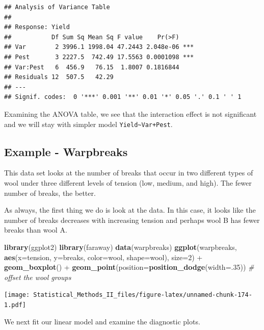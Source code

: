 \documentclass[]{book}
\newenvironment{Shaded}{\begin{snugshade}}{\end{snugshade}}
\newcommand{\KeywordTok}[1]{\textcolor[rgb]{0.13,0.29,0.53}{\textbf{{#1}}}}
\newcommand{\DataTypeTok}[1]{\textcolor[rgb]{0.13,0.29,0.53}{{#1}}}
\newcommand{\DecValTok}[1]{\textcolor[rgb]{0.00,0.00,0.81}{{#1}}}
\newcommand{\StringTok}[1]{\textcolor[rgb]{0.31,0.60,0.02}{{#1}}}
\newcommand{\CommentTok}[1]{\textcolor[rgb]{0.56,0.35,0.01}{\textit{{#1}}}}
\newcommand{\NormalTok}[1]{{#1}}
\theoremstyle{definition}
\theoremstyle{definition}
\theoremstyle{remark}
\begin{document}
\begin{verbatim}
## Analysis of Variance Table
## 
## Response: Yield
##           Df Sum Sq Mean Sq F value    Pr(>F)    
## Var        2 3996.1 1998.04 47.2443 2.048e-06 ***
## Pest       3 2227.5  742.49 17.5563 0.0001098 ***
## Var:Pest   6  456.9   76.15  1.8007 0.1816844    
## Residuals 12  507.5   42.29                      
## ---
## Signif. codes:  0 '***' 0.001 '**' 0.01 '*' 0.05 '.' 0.1 ' ' 1
\end{verbatim}

Examining the ANOVA table, we see that the interaction effect is not
significant and we will stay with simpler model
\texttt{Yield\textasciitilde{}Var+Pest}.

\subsection{Example - Warpbreaks}\label{example---warpbreaks}

This data set looks at the number of breaks that occur in two different
types of wool under three different levels of tension (low, medium, and
high). The fewer number of breaks, the better.

As always, the first thing we do is look at the data. In this case, it
looks like the number of breaks decreases with increasing tension and
perhaps wool B has fewer breaks than wool A.

\begin{Shaded}
\begin{Highlighting}[]
\KeywordTok{library}\NormalTok{(ggplot2)}
\KeywordTok{library}\NormalTok{(faraway)}
\KeywordTok{data}\NormalTok{(warpbreaks)}
\KeywordTok{ggplot}\NormalTok{(warpbreaks, }\KeywordTok{aes}\NormalTok{(}\DataTypeTok{x=}\NormalTok{tension, }\DataTypeTok{y=}\NormalTok{breaks, }\DataTypeTok{color=}\NormalTok{wool, }\DataTypeTok{shape=}\NormalTok{wool), }\DataTypeTok{size=}\DecValTok{2}\NormalTok{) +}\StringTok{ }
\StringTok{  }\KeywordTok{geom_boxplot}\NormalTok{() +}
\StringTok{  }\KeywordTok{geom_point}\NormalTok{(}\DataTypeTok{position=}\KeywordTok{position_dodge}\NormalTok{(}\DataTypeTok{width=}\NormalTok{.}\DecValTok{35}\NormalTok{)) }\CommentTok{# offset the wool groups }
\end{Highlighting}
\end{Shaded}

\texttt{[image: Statistical\_Methods\_II\_files/figure-latex/unnamed-chunk-174-1.pdf]}

We next fit our linear model and examine the diagnostic plots.
\end{document}
